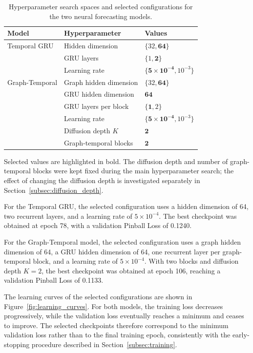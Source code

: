\begin{table}[t]
    \centering
    \caption{Hyperparameter search spaces and selected configurations for the
    two neural forecasting models.}
    \label{tab:hyperparameters}
    \begin{tabular}{lll}
        \toprule
        Model & Hyperparameter & Values \\
        \midrule

        Temporal GRU
        & Hidden dimension & $\{32,\mathbf{64}\}$ \\
        & GRU layers & $\{1,\mathbf{2}\}$ \\
        & Learning rate & $\{\mathbf{5\times10^{-4}},10^{-3}\}$ \\
        \midrule

        Graph-Temporal
        & Graph hidden dimension & $\{32,\mathbf{64}\}$ \\
        & GRU hidden dimension & $\mathbf{64}$ \\
        & GRU layers per block & $\{\mathbf{1},2\}$ \\
        & Learning rate & $\{\mathbf{5\times10^{-4}},10^{-3}\}$ \\
        & Diffusion depth $K$ & $\mathbf{2}$ \\
        & Graph-temporal blocks & $\mathbf{2}$ \\
        \bottomrule
    \end{tabular}
\end{table}

Selected values are highlighted in bold. The diffusion depth and number of
graph-temporal blocks were kept fixed during the main hyperparameter search;
the effect of changing the diffusion depth is investigated separately in
Section~\ref{subsec:diffusion_depth}.

For the Temporal GRU, the selected configuration uses a hidden dimension of
64, two recurrent layers, and a learning rate of $5\times10^{-4}$. The best
checkpoint was obtained at epoch 78, with a validation Pinball Loss of
0.1240.

For the Graph-Temporal model, the selected configuration uses a graph hidden
dimension of 64, a GRU hidden dimension of 64, one recurrent layer per
graph-temporal block, and a learning rate of $5\times10^{-4}$. With two
blocks and diffusion depth $K=2$, the best checkpoint was obtained at epoch
106, reaching a validation Pinball Loss of 0.1133.


The learning curves of the selected configurations are shown in
Figure~\ref{fig:learning_curves}. For both models, the training loss decreases
progressively, while the validation loss eventually reaches a minimum and
ceases to improve. The selected checkpoints therefore correspond to the
minimum validation loss rather than to the final training epoch, consistently
with the early-stopping procedure described in
Section~\ref{subsec:training}.

